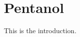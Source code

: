 \documentclass{standalone}
\begin{document}
\chapter{Pentanol}

This is the introduction. \cite{Weber2011,Sarathy2013}
\end{document}
